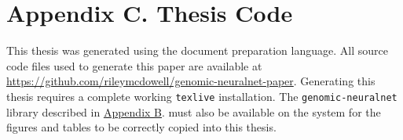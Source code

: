 \chapter*{Appendix C. Thesis Code}

This thesis was generated using the \latex document preparation language. 
All source code files used to generate this paper are available at 
\url{https://github.com/rileymcdowell/genomic-neuralnet-paper}. Generating
this thesis requires a complete working \texttt{texlive} installation.
The \texttt{genomic-neuralnet} library described in
\hyperref[app:analysis-code]{Appendix B}. must also be available on the system for the
figures and tables to be correctly copied into this thesis.



